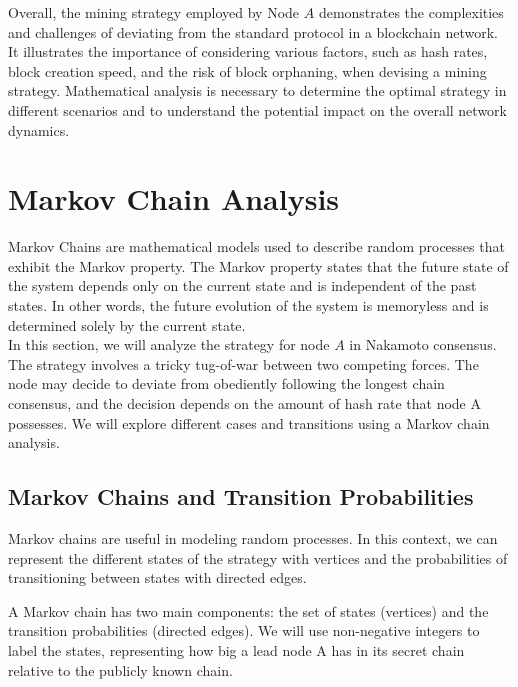 Overall, the mining strategy employed by Node $A$ demonstrates the complexities and challenges of deviating from the standard protocol in a blockchain network. It illustrates the importance of considering various factors, such as hash rates, block creation speed, and the risk of block orphaning, when devising a mining strategy. Mathematical analysis is necessary to determine the optimal strategy in different scenarios and to understand the potential impact on the overall network dynamics.

\section{Markov Chain Analysis}
Markov Chains are mathematical models used to describe random processes that exhibit the Markov property. The Markov property states that the future state of the system depends only on the current state and is independent of the past states. In other words, the future evolution of the system is memoryless and is determined solely by the current state.\\
In this section, we will analyze the strategy for node $A$ in Nakamoto consensus. The strategy involves a tricky tug-of-war between two competing forces. The node may decide to deviate from obediently following the longest chain consensus, and the decision depends on the amount of hash rate that node A possesses. We will explore different cases and transitions using a Markov chain analysis.

\subsection{Markov Chains and Transition Probabilities}
Markov chains are useful in modeling random processes. In this context, we can represent the different states of the strategy with vertices and the probabilities of transitioning between states with directed edges.

A Markov chain has two main components: the set of states (vertices) and the transition probabilities (directed edges). We will use non-negative integers to label the states, representing how big a lead node A has in its secret chain relative to the publicly known chain.

